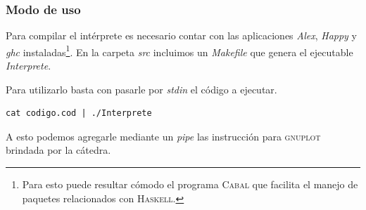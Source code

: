 \subsubsection{Modo de uso}
Para compilar el int\'erprete es necesario contar con las aplicaciones 
\textit{Alex}, \textit{Happy} y \textit{ghc} instaladas\footnote{Para esto
puede resultar c\'omodo el programa \textsc{Cabal} que facilita el manejo
de paquetes relacionados con \textsc{Haskell}.}. En la carpeta
\textit{src} incluimos un \textit{Makefile} que genera el ejecutable
\textit{Interprete}.

Para utilizarlo basta con pasarle por \textit{stdin} el c\'odigo a ejecutar.
\begin{verbatim}
cat codigo.cod | ./Interprete
\end{verbatim}
A esto podemos agregarle mediante un \textit{pipe} las instrucci\'on para
\textsc{gnuplot} brindada por la c\'atedra.
